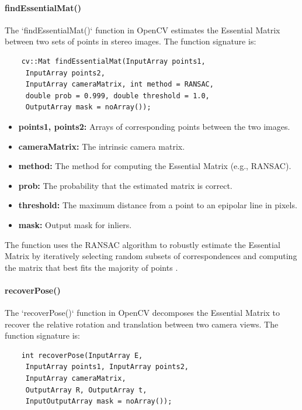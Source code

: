 \documentclass[conference, a4paper]{IEEEtran}
\begin{document}
\paragraph{findEssentialMat()}
The `findEssentialMat()` function in OpenCV estimates the Essential Matrix between two sets of points in stereo images. The function signature is:

\begingroup
\fontsize{8}{10}\selectfont
\begin{verbatim}
	cv::Mat findEssentialMat(InputArray points1,
	 InputArray points2,
	 InputArray cameraMatrix, int method = RANSAC,
	 double prob = 0.999, double threshold = 1.0,
	 OutputArray mask = noArray());
\end{verbatim}
\endgroup

\begin{itemize}
	\item\textbf{points1, points2:} Arrays of corresponding points between the two images.
	\item\textbf{cameraMatrix:} The intrinsic camera matrix.
	\item\textbf{method:} The method for computing the Essential Matrix (e.g., RANSAC).
	\item\textbf{prob:} The probability that the estimated matrix is correct.
	\item\textbf{threshold:} The maximum distance from a point to an epipolar line in pixels.
	\item\textbf{mask:} Output mask for inliers.
\end{itemize}

The function uses the RANSAC algorithm to robustly estimate the Essential Matrix by iteratively selecting random subsets of correspondences and computing the matrix that best fits the majority of points \cite{opencv_findEssentialMat}.

\paragraph{recoverPose()}
The `recoverPose()` function in OpenCV decomposes the Essential Matrix to recover the relative rotation and translation between two camera views. The function signature is:

\begingroup
\fontsize{8}{10}\selectfont
\begin{verbatim}
	int recoverPose(InputArray E,
	 InputArray points1, InputArray points2,
	 InputArray cameraMatrix,
	 OutputArray R, OutputArray t,
	 InputOutputArray mask = noArray());
\end{verbatim}
\endgroup
\end{document}
